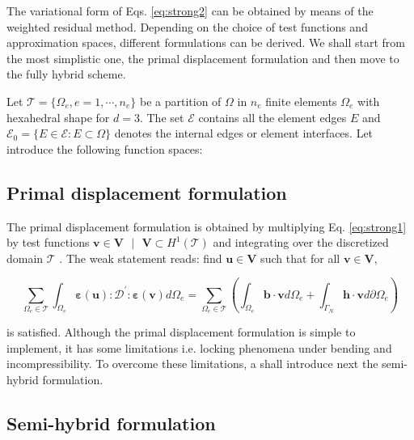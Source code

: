 \documentclass{wccm2024}
\begin{document}
The variational form of Eqs. \eqref{eq:strong2} can be obtained by means of the weighted residual method. Depending on the choice of test functions and approximation spaces, different formulations can be derived. We shall start from the most simplistic one, the primal displacement formulation and then move to the fully hybrid scheme.

Let $\mathcal{T}=\{\Omega_e,e=1, \cdots, n_e \}$ be a partition of $\Omega$ in $n_e$ finite elements $\Omega_e$ with hexahedral shape for $d=3$. The set $\mathcal{E}$ contains all the element edges $E$ and $\mathcal{E}_0=\{E \in \mathcal{E} : E \subset \Omega \}$ denotes the internal edges or element interfaces. Let introduce the following function spaces: 

\subsection{Primal displacement formulation}

The primal displacement formulation is obtained by multiplying Eq. \eqref{eq:strong1} by test functions $\mathbf{v} \in \mathbf{V}\text{ } | \text{ }\mathbf{V} \subset H^1(\mathcal{T})$ and integrating over the discretized domain $\mathcal{T}$ \cite{becker1981finite}. The weak statement reads: find $\mathbf{u} \in \mathbf{V}$ such that for all $\mathbf{v} \in \mathbf{V}$,

\begin{equation} \label{eq:primal-displacement}
    \sum_{\Omega_e \in \mathcal{T}} \int_{\Omega_e} \boldsymbol{\varepsilon}(\mathbf{u}) : \mathcal{D}^{'} : \boldsymbol{\varepsilon}(\mathbf{v}) d\Omega_e = \sum_{\Omega_e \in \mathcal{T}} \left(\int_{\Omega_e} \mathbf{b} \cdot \mathbf{v} d\Omega_e + \int_{\Gamma_N} \mathbf{h} \cdot \mathbf{v} d\partial\Omega_e \right)
\end{equation}

\noindent is satisfied. Although the primal displacement formulation is simple to implement, it has some limitations i.e. locking phenomena under bending and incompressibility. To overcome these limitations, a shall introduce next the semi-hybrid formulation.

\subsection{Semi-hybrid formulation}
\end{document}
